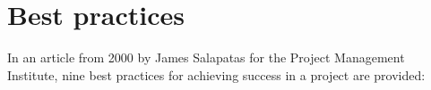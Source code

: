 

\usepackage{rotating}
\usepackage{booktabs}



\maketitle


\tableofcontents

\section{Best practices}\label{best-practices}

In an article from 2000 by James Salapatas for the Project Management Institute, nine best practices for achieving success in a project are provided\cite{salapatas2000}: 

